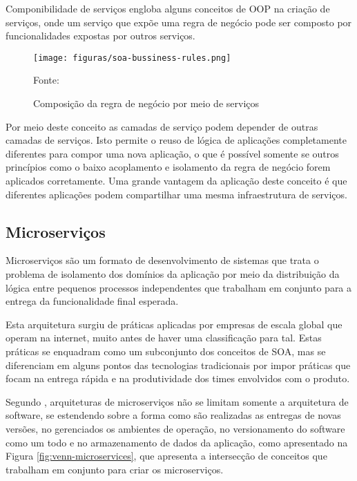 Componibilidade de serviços engloba alguns conceitos de \ac{OOP} na criação
de serviços, onde um serviço que expõe uma regra de negócio pode ser composto
por funcionalidades expostas por outros serviços.

\begin{figure}[H]
	\centering
	\caption{Composição da regra de negócio por meio de serviços}
	\texttt{[image: figuras/soa-bussiness-rules.png]}

	\label{fig:soa-bussiness-rules}
	\footnotesize Fonte: 
\end{figure}

Por meio deste conceito as camadas de serviço podem depender de outras camadas
de serviços. Isto permite o reuso de lógica de aplicações completamente
diferentes para compor uma nova aplicação, o que é possível somente se outros
princípios como o baixo acoplamento e isolamento da regra de negócio forem
aplicados corretamente. Uma grande vantagem da aplicação deste conceito é
que diferentes aplicações podem compartilhar uma mesma infraestrutura
de serviços.

\subsection{Microserviços}

Microserviços são um formato de desenvolvimento de sistemas que trata o
problema de isolamento dos domínios da aplicação por meio da distribuição
da lógica entre pequenos processos independentes que trabalham em conjunto
para a entrega da funcionalidade final esperada.

Esta arquitetura surgiu de práticas aplicadas por empresas de escala global que
operam na internet, muito antes de haver uma classificação para tal. Estas
práticas se enquadram como um subconjunto dos conceitos de \ac{SOA}, mas se
diferenciam em alguns pontos das tecnologias tradicionais por impor práticas
que focam na entrega rápida e na produtividade dos times envolvidos com
o produto.

Segundo , arquiteturas de microserviços não se limitam
somente a arquitetura de software, se estendendo sobre a forma como são
realizadas as entregas de novas versões, no gerenciados os ambientes
de operação, no versionamento do software como um todo e no armazenamento de
dados da aplicação, como apresentado na Figura \ref{fig:venn-microservices},
que apresenta a intersecção de conceitos que trabalham em conjunto para criar
os microserviços.

